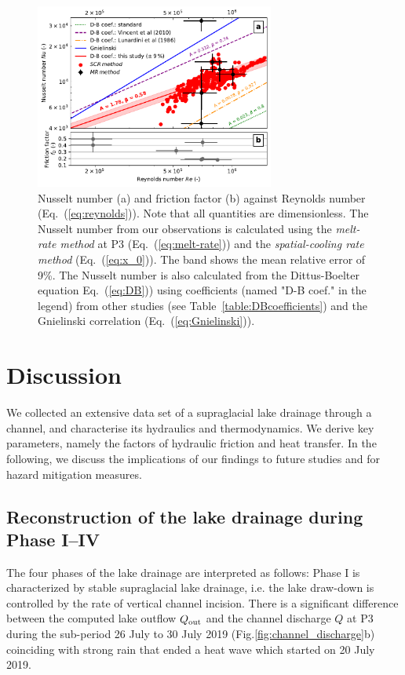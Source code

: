 \begin{figure}[h]
    \centering
    \includegraphics[width=0.7\textwidth]{chapters/chapter_plainemorte/fig09.pdf}
    \caption{Nusselt number (a) and friction factor (b) against Reynolds number (Eq.~(\ref{eq:reynolds})). Note that all quantities are dimensionless. The Nusselt number from our observations is calculated using the \textit{melt-rate method} at P3 (Eq.~(\ref{eq:melt-rate})) and the \textit{spatial-cooling rate method} (Eq.~(\ref{eq:x_0})). The band shows the mean relative error of 9\%. The Nusselt number is also calculated from the Dittus-Boelter equation Eq.~(\ref{eq:DB})) using coefficients (named "D-B coef." in the legend) from other studies (see Table~\ref{table:DBcoefficients}) and the Gnielinski correlation (Eq.~(\ref{eq:Gnielinski})).}
    \label{fig:Re_Nu}
\end{figure}


\section{Discussion}

We collected an extensive data set of a supraglacial lake drainage through a channel, and characterise its hydraulics and thermodynamics.  We derive key parameters, namely the factors of hydraulic friction and heat transfer.  In the following, we discuss the implications of our findings to future studies and for hazard mitigation measures.

\subsection{Reconstruction of the lake drainage during Phase I--IV}

The four phases of the lake drainage are interpreted as follows:  Phase I is characterized by stable supraglacial lake drainage, i.e. the lake draw-down is controlled by the rate of vertical channel incision. There is a significant difference between the computed lake outflow $Q_{\rm out}$ and the channel discharge $Q$ at P3 during the sub-period 26 July to 30 July 2019 (Fig.\ref{fig:channel_discharge}b) coinciding with strong rain that ended a heat wave which started on 20 July 2019.

